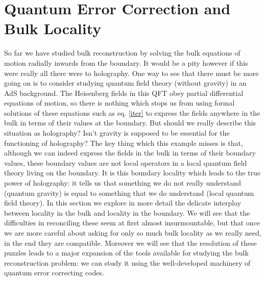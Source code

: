 \documentclass[toc]{PoS}
\begin{document}
\section{Quantum Error Correction and Bulk Locality}\label{qecsec}
So far we have studied bulk reconstruction by solving the bulk equations of motion radially inwards from the boundary.  It would be a pity however if this were really all there were to holography.  One way to see that there must be more going on is to consider studying quantum field theory (without gravity) in an AdS background.  The Heisenberg fields in this QFT obey partial differential equations of motion, so there is nothing which stops us from using formal solutions of these equations such as eq. \eqref{iter} to express the fields anywhere in the bulk in terms of their values at the boundary.  But should we really describe this situation as holography?  Isn't gravity is supposed to be essential for the functioning of holography?  The key thing which this example misses is that, although we can indeed express the fields in the bulk in terms of their boundary values, these boundary values are not local operators in a local quantum field theory living on the boundary.  It is this boundary locality which leads to the true power of holography: it tells us that something we do not really understand (quantum gravity) is equal to something that we do understand (local quantum field theory).  In this section we explore in more detail the delicate interplay between locality in the bulk and locality in the boundary.  We will see that the difficulties in reconciling these seem at first almost insurmountable, but that once we are more careful about asking for only so much bulk locality as we really need, in the end they are compatible.  Moreover we will see that the resolution of these puzzles leads to a major expansion of the tools available for studying the bulk reconstruction problem: we can study it using the well-developed machinery of quantum error correcting codes.  
\end{document}
